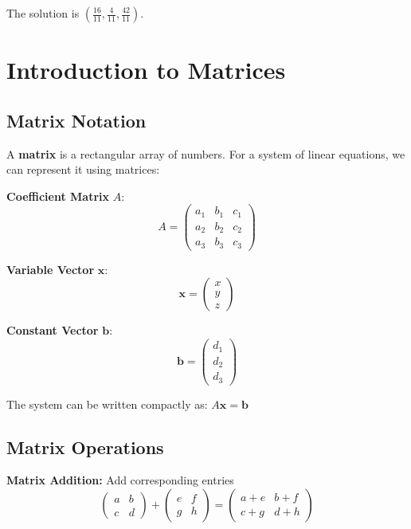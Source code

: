 \documentclass[12pt]{article}
\begin{document}
The solution is $\left(\frac{16}{11}, \frac{4}{11}, \frac{42}{11}\right)$.

\section{Introduction to Matrices}

\subsection{Matrix Notation}

A \textbf{matrix} is a rectangular array of numbers. For a system of linear equations, we can represent it using matrices:

\textbf{Coefficient Matrix} $A$:
$$A = \begin{pmatrix}
a_1 & b_1 & c_1 \\
a_2 & b_2 & c_2 \\
a_3 & b_3 & c_3
\end{pmatrix}$$

\textbf{Variable Vector} $\mathbf{x}$:
$$\mathbf{x} = \begin{pmatrix} x \\ y \\ z \end{pmatrix}$$

\textbf{Constant Vector} $\mathbf{b}$:
$$\mathbf{b} = \begin{pmatrix} d_1 \\ d_2 \\ d_3 \end{pmatrix}$$

The system can be written compactly as: $A\mathbf{x} = \mathbf{b}$

\subsection{Matrix Operations}

\textbf{Matrix Addition:} Add corresponding entries
$$\begin{pmatrix} a & b \\ c & d \end{pmatrix} + \begin{pmatrix} e & f \\ g & h \end{pmatrix} = \begin{pmatrix} a+e & b+f \\ c+g & d+h \end{pmatrix}$$
\end{document}
